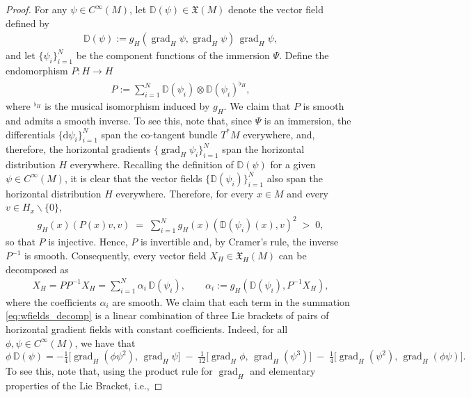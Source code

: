 \documentclass[10pt,a4paper]{amsart}
\newcommand{\Cinf}{C^{\infty}(\M)}
\newcommand{\M}{M}
\newcommand{\XH}{\mathfrak{X}_H(\M)}
\DeclareMathOperator{\grad}{\mathrm{grad}}
\begin{document}
\begin{proof}
%
For any $\psi \in \Cinf$, let $\mathbb{D}(\psi)\in\mathfrak{X}(\M)$ denote the vector field defined by
%
\begin{align*}
    \mathbb{D}(\psi) := g_H(\grad_H \psi,\grad_H \psi)\, \grad_H\psi,
\end{align*}
%
and let $\{\psi_i\}_{i=1}^N$ be the component functions of the immersion $\Psi$. Define the endomorphism $P:H\rightarrow H$
%
\begin{align*}
    P:=\sum_{i=1}^{N} \mathbb{D}(\psi_i) \otimes \mathbb{D}(\psi_i)^{\flat_H},
\end{align*}
%
where $^{\flat_H}$ is the musical isomorphism induced by $g_H$. We claim that $P$ is smooth and admits a smooth inverse. To see this, note that, since $\Psi$ is an immersion, the differentials $\{\mathrm{d}\psi_i\}_{i=1}^{N}$ span the co-tangent bundle $T^{*}\M$ everywhere, and, therefore, the horizontal gradients $\{\grad_H\psi_i\}_{i=1}^{N}$ span the horizontal distribution $H$ everywhere. Recalling the definition of $\mathbb{D}(\psi)$ for a given $\psi\in\Cinf$, it is clear that the vector fields $\{\mathbb{D}(\psi_i)\}_{i=1}^{N}$ also span the horizontal distribution $H$ everywhere. Therefore, for
every $x\in\M$ and every $v\in H_x\backslash\{0\}$,
%
\begin{align*}
    g_H(x)(P(x)v,v) \;=\; \sum_{i=1}^{N} g_H(x)(\mathbb{D}(\psi_i)(x),v)^2
    \;>\; 0,
\end{align*}
%
so that $P$ is injective. Hence, $P$ is invertible and, by Cramer's rule, the inverse $P^{-1}$ is smooth. Consequently, every vector field $X_H \in \XH$ can be
decomposed as
%
\begin{align}\label{eq:wfields_decomp}
    X_H = PP^{-1}X_H=\sum_{i=1}^{N} \alpha_i\,\mathbb{D}(\psi_i),
    \qquad \alpha_i := g_H(\mathbb{D}(\psi_i),P^{-1}X_H),
\end{align}
%
where the coefficients $\alpha_i$ are smooth. We claim that each term in the summation \eqref{eq:wfields_decomp} is a linear combination of three Lie brackets of pairs of horizontal gradient fields with constant coefficients. Indeed, for all $\phi, \psi \in \Cinf$, we have that
%
\begin{equation}\label{eq:absorption}
\phi\, \mathbb{D}(\psi)
= -\tfrac{1}{4}\bigl[ \grad_H(\phi \psi^{2}),\, \grad_H \psi \bigr]
\;-\; \tfrac{1}{12}\bigl[ \grad_H \phi,\, \grad_H(\psi^{3}) \bigr]
\;-\; \tfrac{1}{4}\bigl[ \grad_H(\psi^{2}),\, \grad_H(\phi \psi) \bigr].
\end{equation}
%
To see this, note that, using the product rule for $\grad_H$ and elementary properties of the Lie Bracket, i.e.,

\end{proof}
\end{document}
